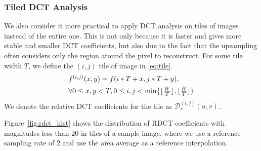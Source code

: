 \documentclass[journal,conference]{IEEEtran}
\begin{document}
\subsubsection{Tiled DCT Analysis} We also consider it more practical to apply DCT analysis on tiles of images instead of the entire one.
This is not only because it is faster and gives more stable and smaller DCT coefficients, but also due to the fact that the upsampling often considers only the region around the pixel to reconstruct.
For some tile width $T$, we define the $(i, j)$ tile of image in \eqref{eq:tile}.
\begin{equation}
	\begin{array}{l}
		f^{(i,j)}(x, y) = f(i * T + x, j * T + y), \\
		\vspace{-0.75em}\\
		\forall 0 \leq x, y < T, 0 \leq i, j < \min\{\lfloor\frac{W}{T}\rfloor, \lfloor\frac{H}{T}\rfloor\}
	\end{array}
	\label{eq:tile}
\end{equation}
We denote the relative DCT coefficients for the tile as $\mathcal{D}_r^{(i, j)}(u, v)$.

Figure~\ref{fig:rdct_hist} shows the distribution of RDCT coefficients with magnitudes less than 20 in tiles of a sample image, where we use a reference sampling rate of 2 and use the area average as a reference interpolation.
\end{document}
